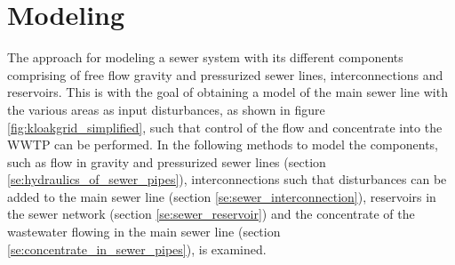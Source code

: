 \chapter{Modeling}\label{se:modeling}

The approach for modeling a sewer system with its different components comprising of free flow gravity and pressurized sewer lines, interconnections and reservoirs. This is with the goal of obtaining a model of the main sewer line with the various areas as input disturbances, as shown in figure \ref{fig:kloakgrid_simplified}, such that control of the flow and concentrate into the WWTP can be performed. In the following methods to model the components, such as flow in gravity and pressurized sewer lines (section \ref{se:hydraulics_of_sewer_pipes}), interconnections such that disturbances can be added to the main sewer line (section \ref{se:sewer_interconnection}), reservoirs in the sewer network (section \ref{se:sewer_reservoir}) and the concentrate of the wastewater flowing in the main sewer line (section \ref{se:concentrate_in_sewer_pipes}), is examined.








